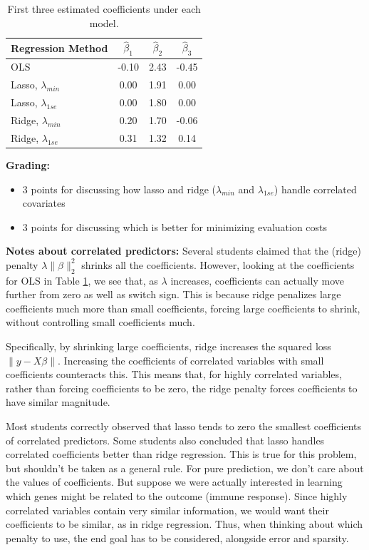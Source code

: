 \documentclass[12pt]{article}
\renewcommand{\hat}{\widehat}
\newcommand{\1}{\mathbbm{1}}
\begin{document}
\begin{enumerate}
\begin{table}[h]
\centering
\begin{tabular}{|l|c|c|c|}
\hline
Regression Method       & $\hat\beta_1$ & $\hat\beta_2$ & $\hat\beta_3$ \\
\hline
OLS                     & -0.10         & 2.43          & -0.45         \\
\hline
Lasso, $\lambda_{min}$  & 0.00          & 1.91          & 0.00          \\
\hline
Lasso, $\lambda_{1se}$  & 0.00          & 1.80          & 0.00          \\
\hline
Ridge, $\lambda_{min}$  & 0.20          & 1.70          & -0.06         \\
\hline
Ridge, $\lambda_{1se}$  & 0.31          & 1.32          & 0.14          \\
\hline
\end{tabular}
\caption{First three estimated coefficients under each model.}
\label{tab:3coeffs}
\end{table}

{\bf Grading:}
\begin{itemize}
\item 3 points for discussing how lasso and ridge ($\lambda_{min}$ and
$\lambda_{1se}$) handle correlated covariates
\item 3 points for discussing which is better for minimizing evaluation costs
\end{itemize}

{\bf Notes about correlated predictors:} Several students claimed that the
(ridge) penalty $\lambda \|\beta\|_2^2$ shrinks all the coefficients. However,
looking at the coefficients for OLS in Table \ref{tab:3coeffs}, we see that, as
$\lambda$ increases, coefficients can actually move further from zero as well
as switch sign. This is because ridge penalizes large coefficients much more
than small coefficients, forcing large coefficients to shrink, without
controlling small coefficients much.

Specifically, by shrinking large coefficients, ridge increases the squared loss
$\|y - X\beta\|$. Increasing the coefficients of correlated variables with
small coefficients counteracts this. This means that, for highly correlated
variables, rather than forcing coefficients to be zero, the ridge penalty
forces coefficients to have similar magnitude.

Most students correctly observed that lasso tends to zero the smallest
coefficients of correlated predictors.
Some students also concluded that lasso handles correlated coefficients better
than ridge regression. This is true for this problem, but shouldn't be taken as
a general rule. For pure prediction, we don't care about the values of
coefficients. But suppose we were actually interested in learning which genes
might be related to the outcome (immune response). Since highly correlated
variables contain very similar information, we would want their coefficients to
be similar, as in ridge regression. Thus, when thinking about which penalty to
use, the end goal has to be considered, alongside error and sparsity.


\end{enumerate}
\end{document}
